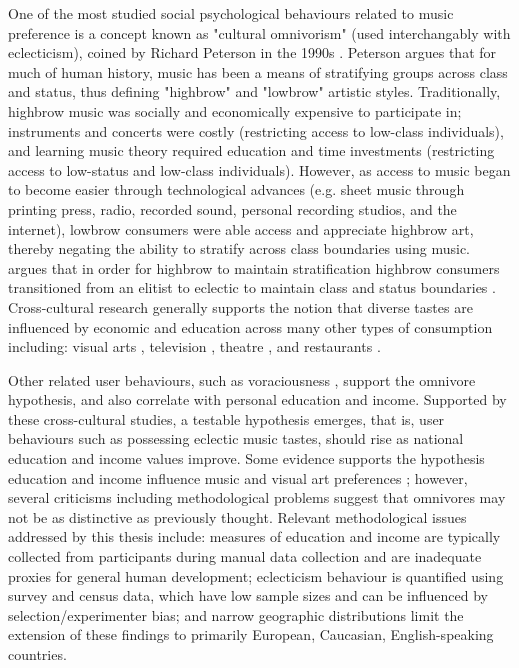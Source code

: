 \documentclass[a4paper]{article}
\begin{document}
One of the most studied social psychological behaviours related to music preference is a concept known as "cultural omnivorism" (used interchangably with eclecticism), coined by Richard Peterson in the 1990s \cite{peterson1996changing,warde1999consumption,katz2002highbrow,katz2004cultural,chan2007socialmusic}. Peterson argues that for much of human history, music has been a means of stratifying groups across class and status, thus defining "highbrow" and "lowbrow" artistic styles. Traditionally, highbrow music was socially and economically expensive to participate in; instruments and concerts were costly (restricting access to low-class individuals), and learning music theory required education and time investments (restricting access to low-status and low-class individuals). However, as access to music began to become easier through technological advances (e.g. sheet music through printing press, radio, recorded sound, personal recording studios, and the internet), lowbrow consumers were able access and appreciate highbrow art, thereby negating the ability to stratify across class boundaries using music. \cite{peterson1996changing} argues that in order for highbrow to maintain stratification highbrow consumers transitioned from an elitist to eclectic to maintain class and status boundaries \cite{chan2005social}. Cross-cultural research generally supports the notion that diverse tastes are influenced by economic and education across many other types of consumption including: visual arts \cite{chan2005social}, television \cite{lizardo2009highbrow}, theatre \cite{chan2007socialvisual}, and restaurants \cite{warde1999consumption}. 

Other related user behaviours, such as voraciousness \cite{sullivan2007omnivore}, support the omnivore hypothesis, and also correlate with personal education and income. Supported by these cross-cultural studies, a testable hypothesis emerges, that is, user behaviours such as possessing eclectic music tastes, should rise as national education and income values improve. Some evidence supports the hypothesis education \cite{lopez2005exclusive} and income \cite{le2008class} influence music and visual art preferences \cite{chan2007socialvisual,chan2007socialmusic,chan2005social}; however, several criticisms including methodological problems \cite{peterson1992seven,warde2007understanding} suggest that omnivores may not be as distinctive as previously thought. Relevant methodological issues addressed by this thesis include: measures of education and income are typically collected from participants during manual data collection and are inadequate proxies for general human development; eclecticism behaviour is quantified using survey and census data, which have low sample sizes and can be influenced by selection/experimenter bias; and narrow geographic distributions limit the extension of these findings to primarily European, Caucasian, English-speaking countries. 
\end{document}

